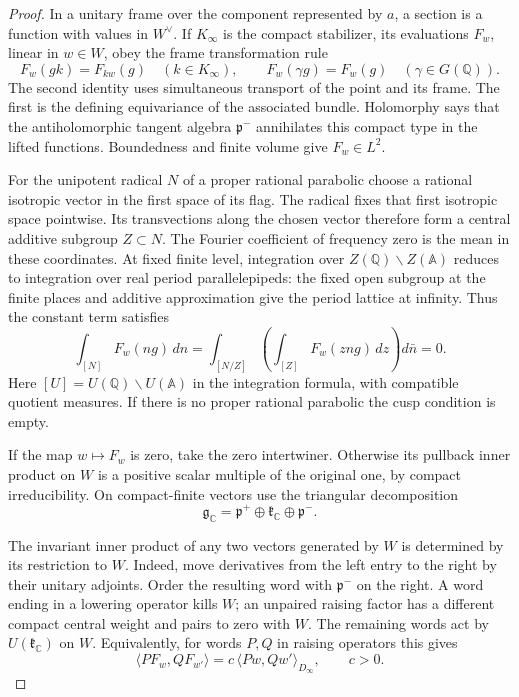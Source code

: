 \begin{proof}
In a unitary frame over the component represented by \(a\), a
section is a function with values in \(W^\vee\). If \(K_\infty\)
is the compact stabilizer, its evaluations \(F_w\), linear in
\(w\in W\), obey the frame transformation rule
\[
     F_w(gk)=F_{kw}(g)\quad(k\in K_\infty),\qquad
     F_w(\gamma g)=F_w(g)\quad(\gamma\in G(\mathbb Q)).
\]
The second identity uses simultaneous transport of the point and
its frame. The first is the defining equivariance of the associated
bundle. Holomorphy says that the antiholomorphic tangent
algebra \(\mathfrak p^-\) annihilates this compact type in the lifted
functions. Boundedness and finite volume give \(F_w\in L^2\).

For the unipotent radical \(N\) of a proper rational parabolic
choose a rational isotropic vector in the first space of its flag.
The radical fixes that first isotropic space pointwise. Its transvections along the chosen vector therefore form a central additive subgroup \(Z\subset N\).
The Fourier coefficient of frequency zero is the mean in these
coordinates. At fixed finite level, integration over
\(Z(\mathbb Q)\backslash Z(\mathbb A)\) reduces to integration over
real period parallelepipeds: the fixed open subgroup at the
finite places and additive approximation give the period
lattice at infinity. Thus the constant term satisfies
\[
 \int_{[N]}F_w(ng)\,dn=
    \int_{[N/Z]}\left(\int_{[Z]}F_w(zng)\,dz\right)d\bar n=0 .
\]
Here \([U]=U(\mathbb Q)\backslash U(\mathbb A)\) in the integration
formula, with compatible quotient measures. If there is no proper
rational parabolic the cusp condition is empty.

If the map \(w\mapsto F_w\) is zero, take the zero intertwiner.
Otherwise its pullback inner product on \(W\) is a positive scalar
multiple of the original one, by compact irreducibility. On
compact-finite vectors use the triangular decomposition
\[
 \mathfrak g_{\mathbb C}=
      \mathfrak p^+\oplus\mathfrak k_{\mathbb C}\oplus\mathfrak p^- .
\]

The invariant inner product of any two vectors generated by \(W\)
is determined by its restriction to \(W\). Indeed, move derivatives
from the left entry to the right by their unitary adjoints. Order
the resulting word with \(\mathfrak p^-\) on the right. A word
ending in a lowering operator kills \(W\); an unpaired raising
factor has a different compact central weight and pairs to zero
with \(W\). The remaining words act by
\(U(\mathfrak k_{\mathbb C})\) on \(W\).
Equivalently, for words \(P,Q\) in raising operators this gives
\[
 \langle P F_w,Q F_{w'}\rangle
     =c\,\langle P w,Q w'\rangle_{D_\infty},
       \qquad c>0 .
\]


\end{proof}
